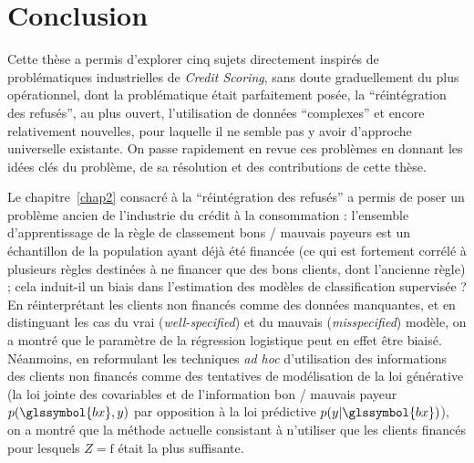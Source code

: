\chapter*{Conclusion}


Cette thèse a permis d'explorer cinq sujets directement inspirés de problématiques industrielles de \textit{Credit Scoring}, sans doute graduellement du plus opérationnel, dont la problématique était parfaitement posée, la ``réintégration des refusés'', au plus ouvert, l'utilisation de données ``complexes'' et encore relativement nouvelles, pour laquelle il ne semble pas y avoir d'approche universelle existante. On passe rapidement en revue ces problèmes en donnant les idées clés du problème, de sa résolution et des contributions de cette thèse.

\medskip

Le chapitre~\ref{chap2} consacré à la ``réintégration des refusés'' a permis de poser un problème ancien de l'industrie du crédit à la consommation : l'ensemble d'apprentissage de la règle de classement bons / mauvais payeurs est un échantillon de la population ayant déjà été financée (ce qui est fortement corrélé à plusieurs règles destinées à ne financer que des bons clients, dont l'ancienne règle) ; cela induit-il un biais dans l'estimation des modèles de classification supervisée ? En réinterprétant les clients non financés comme des données manquantes, et en distinguant les cas du vrai (\textit{well-specified}) et du mauvais (\textit{misspecified}) modèle, on a montré que le paramètre de la régression logistique peut en effet être biaisé. Néanmoins, en reformulant les techniques \textit{ad hoc} d'utilisation des informations des clients non financés comme des tentatives de modélisation de la loi générative (la loi jointe des covariables et de l'information bon / mauvais payeur $p(\glssymbol{bx},y)$ par opposition à la loi prédictive $p(y | \glssymbol{bx})$), on a montré que la méthode actuelle consistant à n'utiliser que les clients financés pour lesquels $Z = \text{f}$ était la plus suffisante.

\medskip

